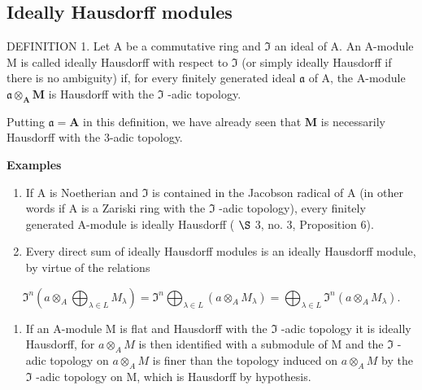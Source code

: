 \subsection{Ideally Hausdorff modules}

DEFINITION 1. Let A be a commutative ring and \(\mathfrak{I}\) an ideal of A. An A-module M is called ideally Hausdorff with respect to \(\mathfrak{I}\) (or simply ideally Hausdorff if there is no ambiguity) if, for every finitely generated ideal \(\mathfrak{a}\) of A, the A-module \(\mathfrak{a} \otimes_{\mathbf{A}} \mathbf{M}\) is Hausdorff with the \(\mathfrak{I}\) -adic topology.

Putting \(\mathfrak{a} = \mathbf{A}\) in this definition, we have already seen that \(\mathbf{M}\) is necessarily Hausdorff with the 3-adic topology.

\textbf{Examples}\par

\begin{enumerate}
\def\labelenumi{(\arabic{enumi})}
\item
  If A is Noetherian and \(\mathfrak{I}\) is contained in the Jacobson radical of A (in other words if A is a Zariski ring with the \(\mathfrak{I}\) -adic topology), every finitely generated A-module is ideally Hausdorff ( \(\S\) 3, no. 3, Proposition 6).
\item
  Every direct sum of ideally Hausdorff modules is an ideally Hausdorff module, by virtue of the relations
\end{enumerate}

\[
\Im^ {n} \left(a \otimes_ {A} \bigoplus_ {\lambda \in L} M _ {\lambda}\right) = \Im^ {n} \bigoplus_ {\lambda \in L} (a \otimes_ {A} M _ {\lambda}) = \bigoplus_ {\lambda \in L} \Im^ {n} (a \otimes_ {A} M _ {\lambda}).
\]

\begin{enumerate}
\def\labelenumi{(\arabic{enumi})}
\setcounter{enumi}{2}
\tightlist
\item
  If an A-module M is flat and Hausdorff with the \(\Im\) -adic topology it is ideally Hausdorff, for \(a \otimes_{A} M\) is then identified with a submodule of M and the \(\Im\) -adic topology on \(a \otimes_{A} M\) is finer than the topology induced on \(a \otimes_{A} M\) by the \(\Im\) -adic topology on M, which is Hausdorff by hypothesis.
\end{enumerate}

